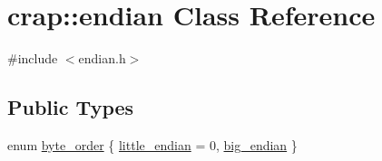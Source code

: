 \hypertarget{classcrap_1_1endian}{\section{crap\-:\-:endian Class Reference}
\label{classcrap_1_1endian}
}


{\ttfamily \#include $<$endian.\-h$>$}

\subsection*{Public Types}
\begin{DoxyCompactItemize}
\item 
enum \hyperlink{classcrap_1_1endian_acd655732bc1be1cbc7614225510b06bc}{byte\-\_\-order} \{ \hyperlink{classcrap_1_1endian_acd655732bc1be1cbc7614225510b06bcacaaaa395ded2e3f4b04bb7b9ddd1dcda}{little\-\_\-endian} = 0, 
\hyperlink{classcrap_1_1endian_acd655732bc1be1cbc7614225510b06bca50318490da9bb7fe3f2d5a6fab6c594e}{big\-\_\-endian}
 \}
\end{DoxyCompactItemize}
